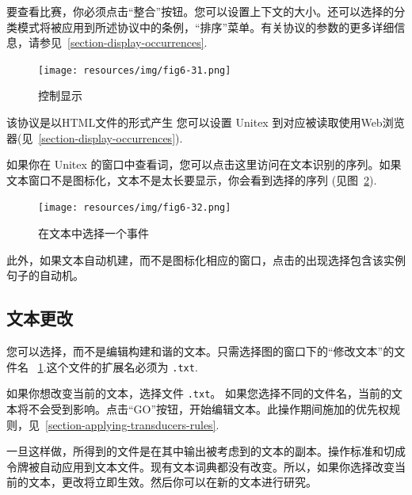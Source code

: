 \bigskip
{}
\noindent 要查看比赛，你必须点击“整合”按钮。您可以设置上下文的大小。还可以选择的分类模式将被应用到所述协议中的条例，“排序”菜单。有关协议的参数的更多详细信息，请参见~\ref{section-display-occurrences}.

\bigskip
\begin{figure}[h]
\begin{center}
\texttt{[image: resources/img/fig6-31.png]}
\caption{控制显示
\label{fig-configuration-display-occurrences}}
\end{center}
\end{figure}

\noindent 该协议是以HTML文件的形式产生
 您可以设置 Unitex 到对应被读取使用Web浏览器(见~\ref{section-display-occurrences}).

\bigskip
\noindent 如果你在 Unitex 的窗口中查看词，您可以点击这里访问在文本识别的序列。如果文本窗口不是图标化，文本不是太长要显示，你会看到选择的序列 (见图~\ref{fig-back-to-text}).

\bigskip
\begin{figure}[h]
\begin{center}
\texttt{[image: resources/img/fig6-32.png]}
\caption{在文本中选择一个事件\label{fig-back-to-text}}
\end{center}
\end{figure}

\noindent 此外，如果文本自动机建，而不是图标化相应的窗口，点击的出现选择包含该实例句子的自动机。


\subsection{文本更改}
\label{section-modifying-text}
您可以选择，而不是编辑构建和谐的文本。只需选择图的窗口下的“修改文本”的文件名
~\ref{fig-configuration-display-occurrences}.这个文件的扩展名必须为 \verb+.txt+.

\bigskip
\noindent 如果你想改变当前的文本，选择文件 \verb+.txt+。
如果您选择不同的文件名，当前的文本将不会受到影响。点击“GO”按钮，开始编辑文本。此操作期间施加的优先权规则，见~\ref{section-applying-transducers-rules}.

\bigskip
\noindent 
一旦这样做，所得到的文件是在其中输出被考虑到的文本的副本。操作标准和切成令牌被自动应用到文本文件。现有文本词典都没有改变。所以，如果你选择改变当前的文本，更改将立即生效。然后你可以在新的文本进行研究。


